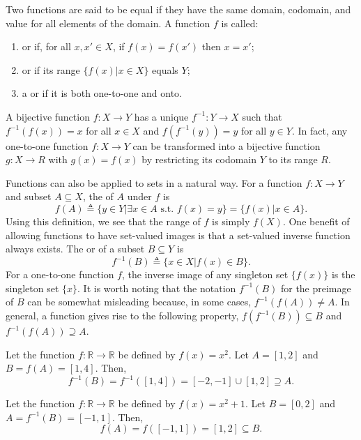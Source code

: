 Two functions are said to be equal if they have the same domain, codomain, and value for all elements of the domain.
A function $f$ is called:
\begin{enumerate}
\item {} or  if, for all $x,x'\in X$, if $f(x)=f(x')$ then $x=x'$;
\item {} or  if its range $\{ f(x) | x\in X\}$ equals $Y$;
\item a  or  if it is both one-to-one and onto.
\end{enumerate}
A bijective function $f \colon X\rightarrow Y$ has a unique  $f^{-1} \colon Y\rightarrow X$ such that $f^{-1}(f(x)) = x$ for all $x\in X$ and $f(f^{-1}(y)) = y$ for all $y\in Y$.
In fact, any one-to-one function $f \colon X\rightarrow Y$ can be transformed into a bijective function $g \colon X \rightarrow R$ with $g(x)=f(x)$ by restricting its codomain $Y$ to its range $R$.

Functions can also be applied to sets in a natural way.
For a function $f \colon X\rightarrow Y$ and subset $A\subseteq X$, the  of $A$ under $f$ is
\[ f(A) \triangleq \{ y\in Y | \exists x\in A \textrm{ s.t. } f(x)=y\} = \{f(x) | x\in A\}. \]
Using this definition, we see that the range of $f$ is simply $f(X)$.
One benefit of allowing functions to have set-valued images is that a set-valued inverse function always exists.
The  or  of a subset $B\subseteq Y$ is
\[ f^{-1}(B) \triangleq \{ x\in X | f(x)\in B\}. \]
For a one-to-one function $f$, the inverse image of any singleton set $\{ f(x) \}$ is the singleton set $\{ x \}$.
It is worth noting that the notation $f^{-1}(B)$ for the preimage of $B$ can be somewhat misleading because, in some cases, $f^{-1}(f(A)) \neq A$.
In general, a function gives rise to the following property, $f(f^{-1}(B)) \subseteq B$ and $f^{-1}(f(A)) \supseteq A$.

\begin{example}
Let the function $f \colon \mathbb{R} \rightarrow \mathbb{R}$ be defined by $f(x)=x^2$. Let $A=[1,2]$ and $B = f(A) = [1,4]$.  Then,
\[ f^{-1}(B) = f^{-1}([1,4]) = [-2,-1] \cup [1,2] \supseteq A. \]
\end{example}
\begin{example}
Let the function $f \colon \mathbb{R} \rightarrow \mathbb{R}$ be defined by $f(x)=x^2+1$. Let $B=[0,2]$ and $A = f^{-1}(B) = [-1,1]$.  Then,
\[ f(A) = f([-1,1]) = [1,2] \subseteq B. \]
\end{example}

